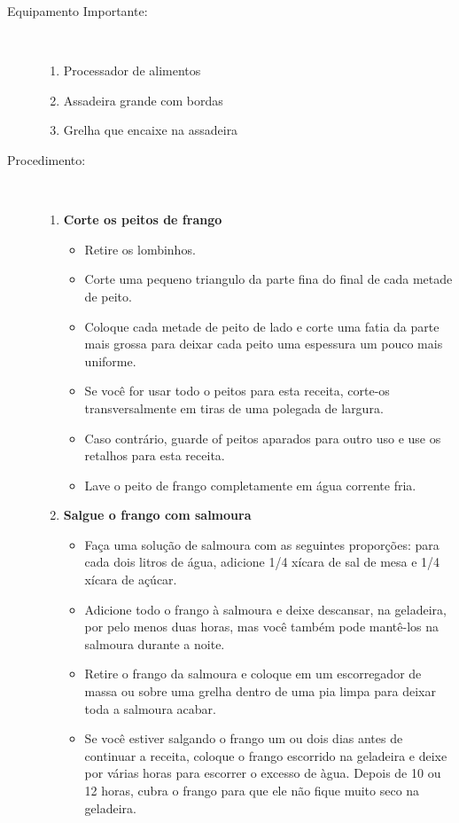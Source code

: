 \documentclass [11pt, papel de carta] {article}
\begin{document}
\begin {description}
\item [Equipamento Importante:] \ \\
\begin {enumerate}
\item Processador de alimentos
\item Assadeira grande com bordas 
\item Grelha que encaixe na assadeira
\end {enumerate}
\item [Procedimento:] \ \\
\begin {enumerate}
\item {\bf Corte os peitos de frango}
\begin {itemize}
\item Retire os lombinhos.
\item Corte uma pequeno triangulo da parte fina do final de cada metade de peito.
\item Coloque cada metade de peito de lado e corte uma fatia da parte mais grossa para deixar cada peito uma espessura um pouco mais uniforme.
\item Se você for usar todo o peitos  para esta receita, corte-os transversalmente em tiras de uma polegada de largura.
\item Caso contrário, guarde of peitos aparados para outro uso e use os retalhos para esta receita.
\item Lave o peito de frango completamente em água corrente fria.
\end {itemize}
\item {\bf Salgue o frango com salmoura}
\begin {itemize}
\item Faça uma solução de salmoura com as seguintes proporções: para cada dois litros de água, adicione 1/4 xícara de sal de mesa e 1/4 xícara de açúcar.
\item Adicione todo o frango à salmoura e deixe descansar, na geladeira, por pelo menos duas horas, mas você também pode mantê-los na salmoura durante a noite.
\item Retire o frango da salmoura e coloque em um escorregador de massa ou sobre uma grelha dentro de uma pia limpa para deixar toda a salmoura acabar.
\item Se você estiver salgando o frango um ou dois dias antes de continuar a receita, coloque o frango escorrido na geladeira e deixe por várias horas para escorrer o excesso de \`agua. Depois de 10 ou 12 horas, cubra o frango para que ele não fique muito seco na geladeira.

\end{itemize}
\end{enumerate}
\end{description}
\end{document}
